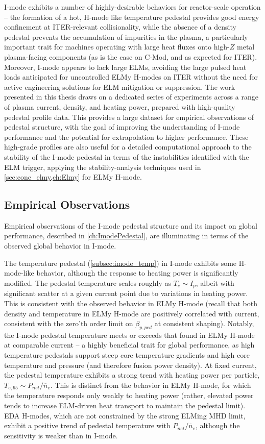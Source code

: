 I-mode exhibits a number of highly-desirable behaviors for reactor-scale operation -- the formation of a hot, H-mode like temperature pedestal provides good energy confinement at ITER-relevant collisionality, while the absence of a density pedestal prevents the accumulation of impurities in the plasma, a particularly important trait for machines operating with large heat fluxes onto high-$Z$ metal plasma-facing components (as is the case on C-Mod, and as expected for ITER).  Moreover, I-mode appears to lack large ELMs, avoiding the large pulsed heat loads anticipated for uncontrolled ELMy H-modes on ITER without the need for active engineering solutions for ELM mitigation or suppression.  The work presented in this thesis draws on a dedicated series of experiments across a range of plasma current, density, and heating power, prepared with high-quality pedestal profile data.  This provides a large dataset for empirical observations of pedestal structure, with the goal of improving the understanding of I-mode performance and the potential for extrapolation to higher performance.  These high-grade profiles are also useful for a detailed computational approach to the stability of the I-mode pedestal in terms of the instabilities identified with the ELM trigger, applying the stability-analysis techniques used in \cref{sec:conc_elmy,ch:Elmy} for ELMy H-mode.

\subsection{Empirical Observations}\label{subsec:conc_imode_emp}

Empirical observations of the I-mode pedestal structure and its impact on global performance, described in \cref{ch:ImodePedestal}, are illuminating in terms of the observed global behavior in I-mode.  

The temperature pedestal (\cref{subsec:imode_temp}) in I-mode exhibits some H-mode-like behavior, although the response to heating power is significantly modified.  The pedestal temperature scales roughly as $T_e \sim I_p$, albeit with significant scatter at a given current point due to variations in heating power.  This is consistent with the observed behavior in ELMy H-mode (recall that both density and temperature in ELMy H-mode are positively correlated with current, consistent with the zero'th order limit on $\beta_{p,ped}$ at consistent shaping).  Notably, the I-mode pedestal temperature meets or exceeds that found in ELMy H-mode at comparable current -- a highly beneficial trait for global performance, as high temperature pedestals support steep core temperature gradients and high core temperature and pressure (and therefore fusion power density).  At fixed current, the pedestal temperature exhibits a strong trend with heating power per particle, $T_{e,95} \sim P_{net}/\overline{n}_e$.  This is distinct from the behavior in ELMy H-mode, for which the temperature responds only weakly to heating power (rather, elevated power tends to increase ELM-driven heat transport to maintain the pedestal limit).  EDA H-modes, which are not constrained by the strong ELMing MHD limit, exhibit a positive trend of pedestal temperature with $P_{net}/\overline{n}_e$, although the sensitivity is weaker than in I-mode.

